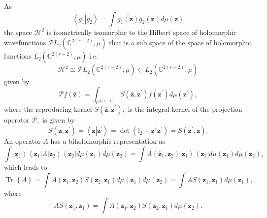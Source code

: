 \documentclass[aps,preprint]{revtex4}%
\begin{document}
As
\begin{equation}
\left\langle g_{1}\left\vert g_{2}\right.  \right\rangle =\int\overline
{g_{1}\left(  \mathbf{z}\right)  }g_{2}\left(  \mathbf{z}\right)  d\mu\left(
\mathbf{z}\right)
\end{equation}
the space $\mathcal{H}^{2}$ is isometrically isomorphic to the Hilbert space
of holomorphic wavefunctions $\mathcal{P}L_{2}\left(  \mathbb{C}^{2\left(
r-2\right)  },\mu\right)  $ that is a sub space of the space of holomorphic
functions $L_{2}\left(  \mathbb{C}^{2\left(  r-2\right)  },\mu\right)  $ i.e.
\begin{equation}
\mathcal{H}^{2}\cong\mathcal{P}L_{2}\left(  \mathbb{C}^{2\left(  r-2\right)
},\mu\right)  \subset L_{2}\left(  \mathbb{C}^{2\left(  r-2\right)  }%
,\mu\right)
\end{equation}
given by
\begin{equation}
\mathcal{P}f\left(  \mathbf{\bar{z}}\right)  =\int_{\mathbb{C}^{2\left(
r-2\right)  }}S\left(  \mathbf{\bar{z},z}^{\prime}\right)  f\left(
\mathbf{z}^{\prime}\right)  d\mu\left(  \mathbf{z}^{\prime}\right)  ,
\end{equation}
where the reproducing kernel $S\left(  \mathbf{\bar{z},z}^{\prime}\right)  ,$
is the integral kernel of the projection operator $\mathcal{P},$ is given by
\begin{equation}
S\left(  \mathbf{\bar{z},z}^{\prime}\right)  =\left\langle \mathbf{z}%
\left\vert \mathbf{z}^{\prime}\right.  \right\rangle =\det\left(
\mathbb{I}_{2}+\mathbf{z}^{\dagger}\mathbf{z}^{\prime}\right)  =\overline
{S\left(  \mathbf{\bar{z}}^{\prime},\mathbf{z}\right)  }.
\end{equation}
An operator $A$ has a biholomorphic representation as
\begin{equation}
\int\left\vert \mathbf{z}_{1}\right\rangle \left\langle \mathbf{z}%
_{1}\right\vert A\left\vert \mathbf{z}_{2}\right\rangle \left\langle
\mathbf{z}_{2}\right\vert d\mu\left(  \mathbf{z}_{1}\right)  d\mu\left(
\mathbf{z}_{2}\right)  =\int A\left(  \mathbf{\bar{z}}_{1},\mathbf{z}%
_{2}\right)  \left\vert \mathbf{z}_{1}\right\rangle \left\langle
\mathbf{z}_{2}\right\vert d\mu\left(  \mathbf{z}_{1}\right)  d\mu\left(
\mathbf{z}_{2}\right)  ,
\end{equation}
which leads to
\begin{equation}
\operatorname*{Tr}\left\{  A\right\}  =\int A\left(  \mathbf{\bar{z}}%
_{1},\mathbf{z}_{2}\right)  S\left(  \mathbf{\bar{z}}_{2},\mathbf{z}%
_{1}\right)  d\mu\left(  \mathbf{z}_{1}\right)  d\mu\left(  \mathbf{z}%
_{2}\right)  =\int AS\left(  \mathbf{\bar{z}}_{1},\mathbf{z}_{1}\right)
d\mu\left(  \mathbf{z}_{1}\right)  ,
\end{equation}
where
\begin{equation}
AS\left(  \mathbf{\bar{z}}_{1},\mathbf{z}_{1}\right)  =\int A\left(
\mathbf{\bar{z}}_{1},\mathbf{z}_{2}\right)  S\left(  \mathbf{\bar{z}}%
_{2},\mathbf{z}_{1}\right)  d\mu\left(  \mathbf{z}_{2}\right)  .
\end{equation}
\end{document}
